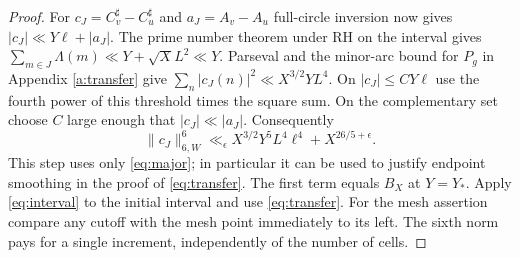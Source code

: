 \documentclass[11pt,a4paper]{article}
\begin{document}
\begin{proof}
For \(c_J=C_v^\sharp-C_u^\sharp\) and \(a_J=A_v-A_u\) full-circle inversion now gives \(|c_J|\ll Y\ell+|a_J|\). The prime number theorem under RH on the interval gives \(\sum_{m\in J}\Lambda(m)\ll Y+\sqrt XL^2\ll Y\). Parseval and the minor-arc bound for \(P_g\) in Appendix \ref{a:transfer} give \(\sum_n|c_J(n)|^2\ll X^{3/2}YL^4\). On \(|c_J|\le CY\ell\) use the fourth power of this threshold times the square sum. On the complementary set choose \(C\) large enough that \(|c_J|\ll|a_J|\). Consequently
\begin{equation}
 \|c_J\|_{6,W}^6\ll_\epsilon X^{3/2}Y^5L^4\ell^4+X^{26/5+\epsilon}.
 \label{eq:interval}
\end{equation}
This step uses only \eqref{eq:major}; in particular it can be used to justify endpoint smoothing in the proof of \eqref{eq:transfer}. The first term equals \(B_X\) at \(Y=Y_*\). Apply \eqref{eq:interval} to the initial interval and use \eqref{eq:transfer}. For the mesh assertion compare any cutoff with the mesh point immediately to its left. The sixth norm pays for a single increment, independently of the number of cells.
\end{proof}
\end{document}
